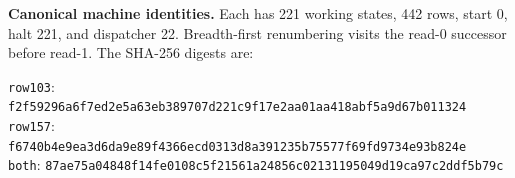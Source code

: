 \textbf{Canonical machine identities.} Each has 221 working states, 442 rows,
start 0, halt 221, and dispatcher 22. Breadth-first renumbering visits the
read-0 successor before read-1. The SHA-256 digests are:
\begin{flushleft}\footnotesize
\texttt{row103}: \nolinkurl{f2f59296a6f7ed2e5a63eb389707d221c9f17e2aa01aa418abf5a9d67b011324}\\
\texttt{row157}: \nolinkurl{f6740b4e9ea3d6da9e89f4366ecd0313d8a391235b75577f69fd9734e93b824e}\\
\texttt{both}: \nolinkurl{87ae75a04848f14fe0108c5f21561a24856c02131195049d19ca97c2ddf5b79c}
\end{flushleft}
